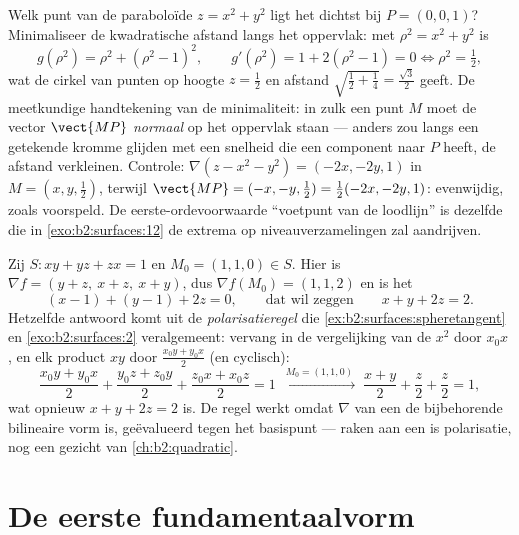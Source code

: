 \begin{example}\label{ex:b2:surfaces:closest}
Welk punt van de paraboloïde $z = x^2 + y^2$ ligt het dichtst bij
$P = (0, 0, 1)$? Minimaliseer de kwadratische afstand langs het
oppervlak: met $\rho^2 = x^2 + y^2$ is
\[
g(\rho^2) = \rho^2 + (\rho^2 - 1)^2,
\qquad
g'(\rho^2) = 1 + 2(\rho^2 - 1) = 0
\iff \rho^2 = \tfrac12 ,
\]
wat de cirkel van punten op hoogte $z = \frac12$ en afstand
$\sqrt{\tfrac12 + \tfrac14} = \frac{\sqrt3}2$ geeft. De meetkundige
handtekening van de minimaliteit: in zulk een punt $M$ moet de
vector $\vect{MP}$ \emph{normaal} op het oppervlak staan --- anders
zou langs een getekende kromme glijden met een snelheid die een
component naar $P$ heeft, de afstand verkleinen. Controle:
$\nabla(z - x^2 - y^2) = (-2x, -2y, 1)$ in $M = (x, y, \tfrac12)$,
terwijl $\vect{MP} = (-x, -y, \tfrac12) = \tfrac12(-2x, -2y, 1)$:
evenwijdig, zoals voorspeld. De eerste-ordevoorwaarde ``voetpunt
van de loodlijn'' is dezelfde die in \cref{exo:b2:surfaces:12} de
extrema op niveauverzamelingen zal aandrijven.
\end{example}

\begin{example}\label{ex:b2:surfaces:polarization}
Zij $S : xy + yz + zx = 1$ en $M_0 = (1, 1, 0) \in S$. Hier is
$\nabla f = (y + z,\ x + z,\ x + y)$, dus $\nabla f(M_0) = (1, 1,
2)$ en is het 
\[
(x - 1) + (y - 1) + 2z = 0,
\qquad\text{dat wil zeggen}\qquad x + y + 2z = 2 .
\]
Hetzelfde antwoord komt uit de \emph{polarisatieregel} die
\cref{ex:b2:surfaces:spheretangent} en \cref{exo:b2:surfaces:2}
veralgemeent: vervang in de vergelijking van de  $x^2$ door
$x_0x$, en elk product $xy$ door $\frac{x_0y + y_0x}2$ (en
cyclisch):
\[
\frac{x_0y + y_0x}2 + \frac{y_0z + z_0y}2 + \frac{z_0x +
x_0z}2 = 1
\;\xrightarrow{\ M_0 = (1,1,0)\ }\;
\frac{x + y}2 + \frac z2 + \frac z2 = 1 ,
\]
wat opnieuw $x + y + 2z = 2$ is. De regel werkt omdat $\nabla$ van
een  de bijbehorende bilineaire vorm is,
geëvalueerd tegen het basispunt --- raken aan een  is
polarisatie, nog een gezicht van \cref{ch:b2:quadratic}.
\end{example}

\section{De eerste fundamentaalvorm}

